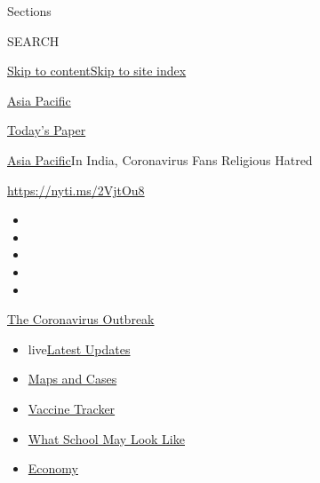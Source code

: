 Sections

SEARCH

\protect\hyperlink{site-content}{Skip to
content}\protect\hyperlink{site-index}{Skip to site index}

\href{https://www.nytimes.com/section/world/asia}{Asia Pacific}

\href{https://myaccount.nytimes.com/auth/login?response_type=cookie\&client_id=vi}{}

\href{https://www.nytimes.com/section/todayspaper}{Today's Paper}

\href{/section/world/asia}{Asia Pacific}\textbar{}In India, Coronavirus
Fans Religious Hatred

\url{https://nyti.ms/2VjtOu8}

\begin{itemize}
\item
\item
\item
\item
\item
\end{itemize}

\href{https://www.nytimes.com/news-event/coronavirus?action=click\&pgtype=Article\&state=default\&region=TOP_BANNER\&context=storylines_menu}{The
Coronavirus Outbreak}

\begin{itemize}
\tightlist
\item
  live\href{https://www.nytimes.com/2020/08/02/world/coronavirus-updates.html?action=click\&pgtype=Article\&state=default\&region=TOP_BANNER\&context=storylines_menu}{Latest
  Updates}
\item
  \href{https://www.nytimes.com/interactive/2020/us/coronavirus-us-cases.html?action=click\&pgtype=Article\&state=default\&region=TOP_BANNER\&context=storylines_menu}{Maps
  and Cases}
\item
  \href{https://www.nytimes.com/interactive/2020/science/coronavirus-vaccine-tracker.html?action=click\&pgtype=Article\&state=default\&region=TOP_BANNER\&context=storylines_menu}{Vaccine
  Tracker}
\item
  \href{https://www.nytimes.com/interactive/2020/07/29/us/schools-reopening-coronavirus.html?action=click\&pgtype=Article\&state=default\&region=TOP_BANNER\&context=storylines_menu}{What
  School May Look Like}
\item
  \href{https://www.nytimes.com/live/2020/07/31/business/stock-market-today-coronavirus?action=click\&pgtype=Article\&state=default\&region=TOP_BANNER\&context=storylines_menu}{Economy}
\end{itemize}

